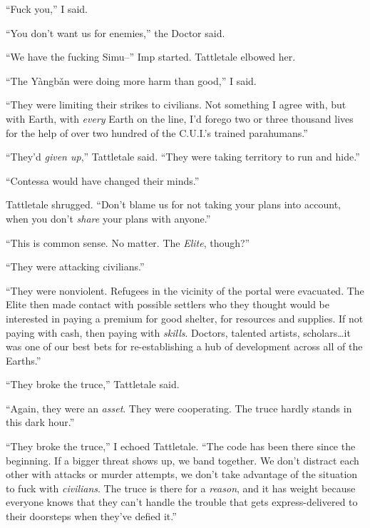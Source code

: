 ``Fuck you,'' I said.



``You don't want us for enemies,'' the Doctor said.



``We have the fucking Simu--'' Imp started.  Tattletale elbowed her.



``The Y\`{a}ngb\v{a}n were doing more harm than good,'' I said.



``They were limiting their strikes to civilians.  Not something I agree with, but with Earth, with \emph{every} Earth on the line, I'd forego two or three thousand lives for the help of over two hundred of the C.U.I.'s trained parahumans.''



``They'd \emph{given up},'' Tattletale said.  ``They were taking territory to run and hide.''



``Contessa would have changed their minds.''



Tattletale shrugged.  ``Don't blame us for not taking your plans into account, when you don't \emph{share} your plans with anyone.''



``This is common sense.  No matter.  The \emph{Elite}, though?''



``They were attacking civilians.''



``They were nonviolent.  Refugees in the vicinity of the portal were evacuated.  The Elite then made contact with possible settlers who they thought would be interested in paying a premium for good shelter, for resources and supplies.  If not paying with cash, then paying with \emph{skills}.  Doctors, talented artists, scholars\ldots it was one of our best bets for re-establishing a hub of development across all of the Earths.''



``They broke the truce,'' Tattletale said.



``Again, they were an \emph{asset}.  They were cooperating.  The truce hardly stands in this dark hour.''



``They broke the truce,'' I echoed Tattletale.  ``The code has been there since the beginning.  If a bigger threat shows up, we band together.  We don't distract each other with attacks or murder attempts, we don't take advantage of the situation to fuck with \emph{civilians}.  The truce is there for a \emph{reason}, and it has weight because everyone knows that they can't handle the trouble that gets express-delivered to their doorsteps when they've defied it.''



